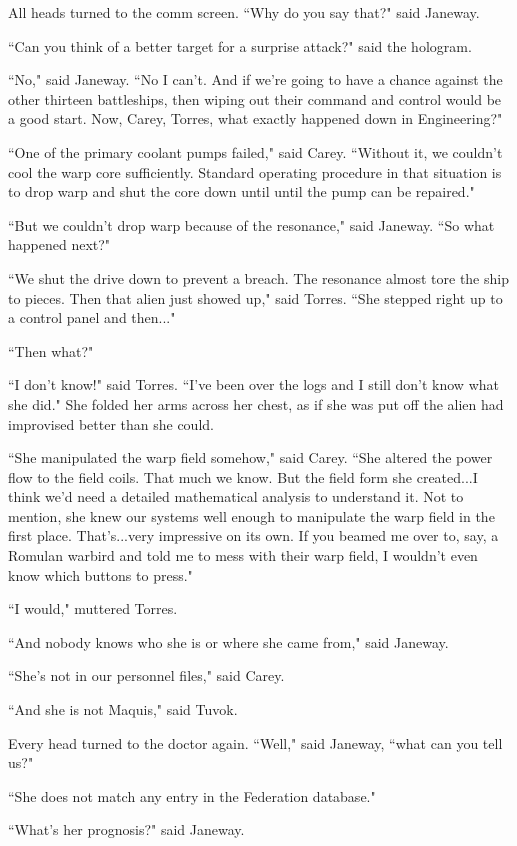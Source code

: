 \documentclass[twoside,letterpaper,12pt]{memoir}
\begin{document}
All heads turned to the comm screen. ``Why do you say that?" said Janeway. 

``Can you think of a better target for a surprise attack?" said the hologram. 

``No," said Janeway. ``No I can't. And if we're going to have a chance against the other thirteen battleships, then wiping out their command and control would be a good start. Now, Carey, Torres, what exactly happened down in Engineering?" 

``One of the primary coolant pumps failed," said Carey. ``Without it, we couldn't cool the warp core sufficiently. Standard operating procedure in that situation is to drop warp and shut the core down until until the pump can be repaired." 

``But we couldn't drop warp because of the resonance," said Janeway. ``So what happened next?" 

``We shut the drive down to prevent a breach. The resonance almost tore the ship to pieces. Then that alien just showed up," said Torres. ``She stepped right up to a control panel and then..." 

``Then what?" 

``I don't know!" said Torres. ``I've been over the logs and I still don't know what she did." She folded her arms across her chest, as if she was put off the alien had improvised better than she could. 

``She manipulated the warp field somehow," said Carey. ``She altered the power flow to the field coils. That much we know. But the field form she created...I think we'd need a detailed mathematical analysis to understand it. Not to mention, she knew our systems well enough to manipulate the warp field in the first place. That's...very impressive on its own. If you beamed me over to, say, a Romulan warbird and told me to mess with their warp field, I wouldn't even know which buttons to press." 

``I would," muttered Torres. 

``And nobody knows who she is or where she came from," said Janeway. 

``She's not in our personnel files," said Carey. 

``And she is not Maquis," said Tuvok. 

Every head turned to the doctor again. ``Well," said Janeway, ``what can you tell us?" 

``She does not match any entry in the Federation database." 

``What's her prognosis?" said Janeway. 
\end{document}
